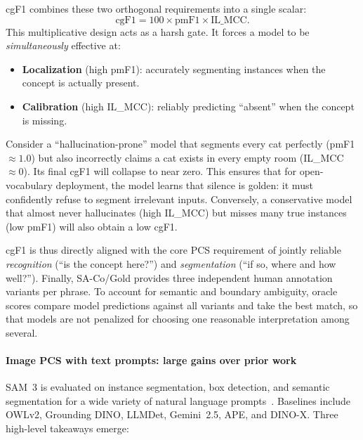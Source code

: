 \begin{enrichment}
\begin{enrichment}
		cgF1 combines these two orthogonal requirements into a single scalar:
		\begin{equation}
			\mathrm{cgF1} = 100 \times \mathrm{pmF1} \times \mathrm{IL\_MCC}.
			\label{eq:chapter15_sam3_cgF1}
		\end{equation}
		This multiplicative design acts as a harsh gate. It forces a model to be \emph{simultaneously} effective at:
		\begin{itemize}
			\item \textbf{Localization} (high pmF1): accurately segmenting instances when the concept is actually present.
			\item \textbf{Calibration} (high IL\_MCC): reliably predicting ``absent'' when the concept is missing.
		\end{itemize}
		
		Consider a ``hallucination-prone'' model that segments every cat perfectly (pmF1 $\approx 1.0$) but also incorrectly claims a cat exists in every empty room (IL\_MCC $\approx 0$). Its final cgF1 will collapse to near zero. This ensures that for open-vocabulary deployment, the model learns that silence is golden: it must confidently refuse to segment irrelevant inputs. Conversely, a conservative model that almost never hallucinates (high IL\_MCC) but misses many true instances (low pmF1) will also obtain a low cgF1.
		
		cgF1 is thus directly aligned with the core PCS requirement of jointly reliable \emph{recognition} (``is the concept here?'') and \emph{segmentation} (``if so, where and how well?''). Finally, SA-Co/Gold provides three independent human annotation variants per phrase. To account for semantic and boundary ambiguity, oracle scores compare model predictions against all variants and take the best match, so that models are not penalized for choosing one reasonable interpretation among several.
		
		\paragraph{Image PCS with text prompts: large gains over prior work}
		
		SAM~3 is evaluated on instance segmentation, box detection, and semantic segmentation for a wide variety of natural language prompts~\cite{carion2025_sam3}. Baselines include OWLv2, Grounding DINO, LLMDet, Gemini~2.5, APE, and DINO-X. Three high-level takeaways emerge:
		

\end{enrichment}
\end{enrichment}
